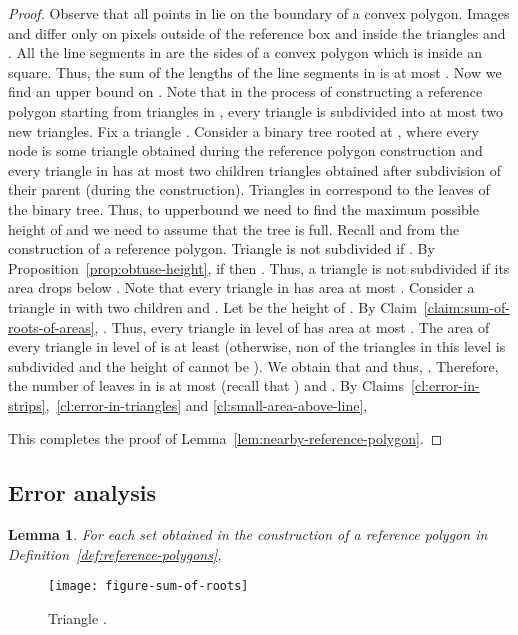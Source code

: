 \documentclass[11pt,english]{article}
\newtheorem{lemma}[theorem]{Lemma}
\numberwithin{figure}{section}
\begin{document}
\begin{proof}
{Observe that all points in  lie on the boundary of a convex polygon. Images  and  differ only on pixels outside of the reference box and inside the triangles  and . All the line segments in  are the sides of a convex polygon which is inside an  square. Thus, the sum of the lengths of the line segments in  is at most . Now we find an upper bound on . Note that in the process of constructing a reference polygon starting from triangles in , every triangle is subdivided into at most two new triangles. Fix a triangle . Consider a binary tree  rooted at , where every node is some triangle obtained during the reference polygon construction and every triangle in  has at most two children triangles obtained after subdivision of their parent (during the construction). Triangles in  correspond to the leaves of the binary tree. Thus, to upperbound  we need to find the maximum possible height of  and we need to assume that the tree is full. Recall  and  from the construction of a reference polygon. Triangle  is not subdivided if . By Proposition~\ref{prop:obtuse-height}, if  then . Thus, a triangle is not subdivided if its area drops below . Note that every triangle in  has area at most . Consider a triangle  in  with two children  and . Let  be the height of . By Claim~\ref{claim:sum-of-roots-of-areas}, .
Thus, every triangle in level  of  has area at most . The area of every triangle in level  of  is at least  (otherwise, non of the triangles in this level is subdivided and the height of  cannot be ). We obtain that  and thus, . Therefore, the number of leaves in  is at most  (recall that ) and . By Claims~\ref{cl:error-in-strips},~\ref{cl:error-in-triangles} and \ref{cl:small-area-above-line},

This completes the proof of Lemma~\ref{lem:nearby-reference-polygon}. }
\end{proof}




\subsection{Error analysis}\label{sec:convexity-dist-approx-error-analysis}

\begin{lemma}\label{lem:sum-of-roots-of-areas}
For each set  obtained in the construction of a reference polygon in Definition~\ref{def:reference-polygons},

\end{lemma}
\begin{figure}[ht]
\centering
\texttt{[image: figure-sum-of-roots]}
\caption{ Triangle .}
\label{fig:sum-of-roots}
\end{figure}
\end{document}
